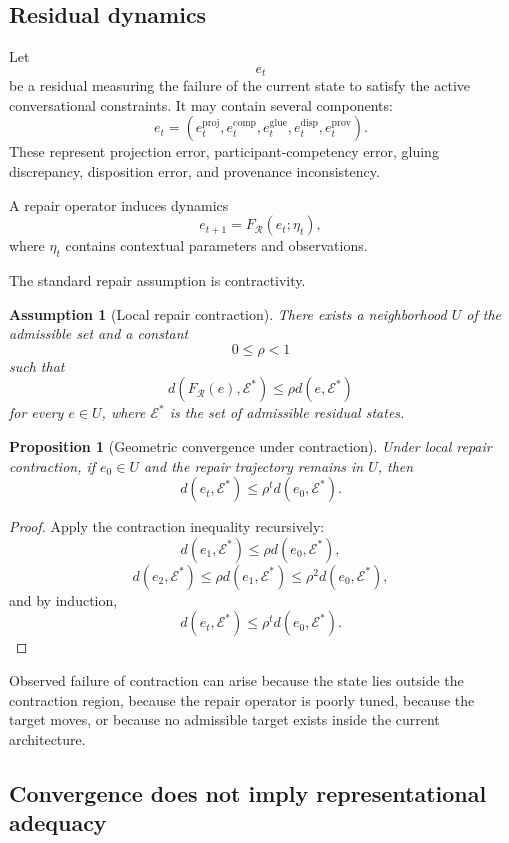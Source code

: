 \documentclass[11pt]{article}
\newtheorem{proposition}[definition]{Proposition}
\newtheorem{assumption}[definition]{Assumption}
\theoremstyle{definition}
\begin{document}
\subsection{Residual dynamics}

Let
\[
e_t
\]
be a residual measuring the failure of the current state to satisfy the active conversational constraints. It may contain several components:
\[
e_t
=
\left(
e_t^{\mathrm{proj}},
e_t^{\mathrm{comp}},
e_t^{\mathrm{glue}},
e_t^{\mathrm{disp}},
e_t^{\mathrm{prov}}
\right).
\]
These represent projection error, participant-competency error, gluing discrepancy, disposition error, and provenance inconsistency.

A repair operator induces dynamics
\[
e_{t+1}
=
F_{\mathcal R}(e_t;\eta_t),
\]
where \(\eta_t\) contains contextual parameters and observations.

The standard repair assumption is contractivity.

\begin{assumption}[Local repair contraction]
There exists a neighborhood \(U\) of the admissible set and a constant
\[
0\leq\rho<1
\]
such that
\[
d
\left(
F_{\mathcal R}(e),
\mathcal E^{*}
\right)
\leq
\rho
d(e,\mathcal E^{*})
\]
for every \(e\in U\), where \(\mathcal E^{*}\) is the set of admissible residual states.
\end{assumption}

\begin{proposition}[Geometric convergence under contraction]
Under local repair contraction, if \(e_0\in U\) and the repair trajectory remains in \(U\), then
\[
d(e_t,\mathcal E^{*})
\leq
\rho^t
d(e_0,\mathcal E^{*}).
\]
\end{proposition}

\begin{proof}
Apply the contraction inequality recursively:
\[
d(e_1,\mathcal E^{*})
\leq
\rho d(e_0,\mathcal E^{*}),
\]
\[
d(e_2,\mathcal E^{*})
\leq
\rho d(e_1,\mathcal E^{*})
\leq
\rho^2d(e_0,\mathcal E^{*}),
\]
and by induction,
\[
d(e_t,\mathcal E^{*})
\leq
\rho^td(e_0,\mathcal E^{*}).
\]
\end{proof}

Observed failure of contraction can arise because the state lies outside the contraction region, because the repair operator is poorly tuned, because the target moves, or because no admissible target exists inside the current architecture.

\subsection{Convergence does not imply representational adequacy}
\end{document}
